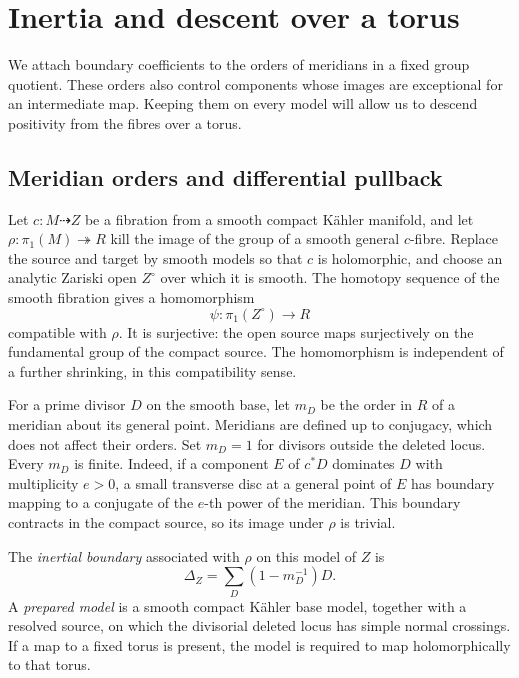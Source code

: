 \section{Inertia and descent over a torus}\label{sec:descent}

We attach boundary coefficients to the orders of meridians in a fixed
group quotient. These orders also control components whose images are
exceptional for an intermediate map. Keeping them on every model will
allow us to descend positivity from the fibres over a torus.

\subsection{Meridian orders and differential pullback}

Let \(c:M\dashrightarrow Z\) be a fibration from a smooth compact
K\"ahler manifold, and let
\(\rho:\pi_1(M)\twoheadrightarrow R\) kill the image of the group
of a smooth general \(c\)-fibre. Replace the source and target by
smooth models so that \(c\) is holomorphic, and choose an analytic
Zariski open \(Z^\circ\) over which it is smooth. The homotopy
sequence of the smooth fibration gives a homomorphism
\[
 \psi:\pi_1(Z^\circ)\longrightarrow R
\]
compatible with \(\rho\). It is surjective: the open source maps
surjectively on the fundamental group of the compact source. The
homomorphism is independent of a further shrinking, in this
compatibility sense.

For a prime divisor \(D\) on the smooth base, let \(m_D\) be the
order in \(R\) of a meridian about its general point. Meridians are
defined up to conjugacy, which does not affect their orders. Set
\(m_D=1\) for divisors outside the deleted locus. Every \(m_D\)
is finite. Indeed, if a component \(E\) of \(c^*D\) dominates
\(D\) with multiplicity \(e>0\), a small transverse disc at a
general point of \(E\) has boundary mapping to a conjugate of the
\(e\)-th power of the meridian. This boundary contracts in the
compact source, so its image under \(\rho\) is trivial.

\begin{definition}\label{de:inertial-boundary}
The \emph{inertial boundary} associated with \(\rho\) on this model
of \(Z\) is
\[
 \Delta_Z=\sum_D(1-m_D^{-1})D.
\]
A \emph{prepared model} is a smooth compact K\"ahler base model,
together with a resolved source, on which the divisorial deleted locus
has simple normal crossings. If a map to a fixed torus is present,
the model is required to map holomorphically to that torus.
\end{definition}

